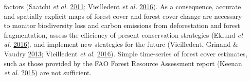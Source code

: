 \documentclass[]{article}
\theoremstyle{definition}
\theoremstyle{definition}
\theoremstyle{definition}
\theoremstyle{remark}
\begin{document}
factors (Saatchi \emph{et al.}
\protect\hyperlink{ref-Saatchi2011}{2011}; Vieilledent \emph{et al.}
\protect\hyperlink{ref-Vieilledent2016}{2016}). As a consequence,
accurate and spatially explicit maps of forest cover and forest cover
change are necessary to monitor biodiversity loss and carbon emissions
from deforestation and forest fragmentation, assess the efficiency of
present conservation strategies (Eklund \emph{et al.}
\protect\hyperlink{ref-Eklund2016}{2016}), and implement new strategies
for the future (Vieilledent, Grinand \& Vaudry
\protect\hyperlink{ref-Vieilledent2013}{2013}; Vieilledent \emph{et al.}
\protect\hyperlink{ref-Vieilledent2016}{2016}). Simple time-series of
forest cover estimates, such as those provided by the FAO Forest
Resource Assessment report (Keenan \emph{et al.}
\protect\hyperlink{ref-Keenan2015}{2015}) are not sufficient.
\end{document}
